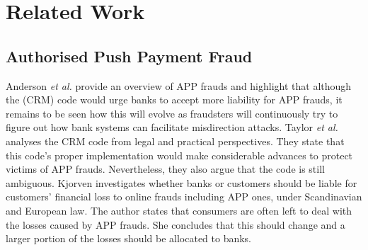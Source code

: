 


\section{Related Work}\label{sec::related-work}

\vspace{-.5mm}
\subsection{Authorised Push Payment Fraud}


Anderson \textit{et al.} \cite{anderson2019measuring} provide an overview of APP frauds and highlight that although  the (CRM) code would urge  banks to accept more liability for APP frauds, it remains to be seen how this will evolve as   fraudsters will continuously try to figure out how bank systems can facilitate misdirection attacks. Taylor \textit{et al.} \cite{taylor2020new} analyses the CRM code from legal and practical perspectives. They  state that this code's proper implementation would make considerable advances to protect victims of APP frauds. Nevertheless, they also  argue that the code is still ambiguous. 
%
%
Kjorven \cite{kjorven2020pays} investigates whether banks or customers should be liable for customers' financial loss to online  frauds including APP ones, under Scandinavian and European law. The author states  that consumers are often left to deal with the losses caused by APP frauds. She concludes that this should change and  a larger portion of the losses should be allocated to banks.

 \vspace{-3mm}
